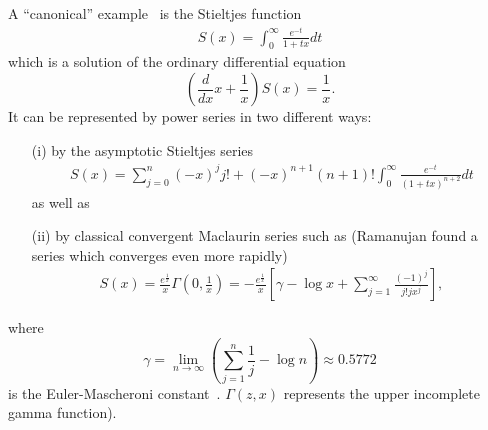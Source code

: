 \documentclass[%
  twocolumn,
 showpacs,
 showkeys,
 preprintnumbers,
 amsmath,amssymb,
 aps,
  pra,
  longbibliography,
 ]{revtex4-1}
\begin{document}
A ``canonical'' example~\cite{Bleistein-Handelsman} is the Stieltjes function
\begin{equation}
\begin{split}
S(x) =  \int_0^\infty    \frac{e^{-t}}{1+tx} dt
\end{split}
\label{2019-m-ch-ds-Stieltjes-function}
\end{equation}
which is a solution of the ordinary differential equation
\begin{equation}
\left(\frac{d}{dx} x+\frac{1}{x}\right) S(x) = \frac{1}{x}
.
\end{equation}
It can be  represented by
power series in two different ways:
\begin{itemize}
\item[(i)]
by the asymptotic Stieltjes series
\begin{equation}
\begin{split}
S(x)=  \sum_{j=0}^n (-x)^j j!  +  (-x)^{n+1}(n+1)!  \int_0^\infty   \frac{e^{-t}}{(1+tx)^{n+2}} dt
\end{split}
\label{2019-m-ch-ds-asymptotic-Stieltjes-series}
\end{equation}
as well as
\item[(ii)]
by classical convergent Maclaurin series such as (Ramanujan found a series which converges even more rapidly)
\begin{equation}
\begin{split}
S(x)
=  \frac{e^\frac{1}{x}}{x}  \Gamma \left( 0, \frac{1}{x} \right)
=  -\frac{e^\frac{1}{x}}{x}  \left[  \gamma - \log x +\sum_{j=1}^\infty \frac{(-1)^j}{j!j x^j} \right]
,
\end{split}
\label{2019-m-ch-ds-Stieltjes-series}
\end{equation}
\end{itemize}
where
\begin{equation}
\gamma
=\lim_{n\rightarrow \infty}\left(
\sum_{j=1}^n \frac{1}{j}- \log n
\right) \approx 0.5772 \end{equation}
is the Euler-Mascheroni constant~\cite{Sloane_oeis.org/A001620}.
$\Gamma (z,x)$ represents the upper incomplete gamma function).
\end{document}
